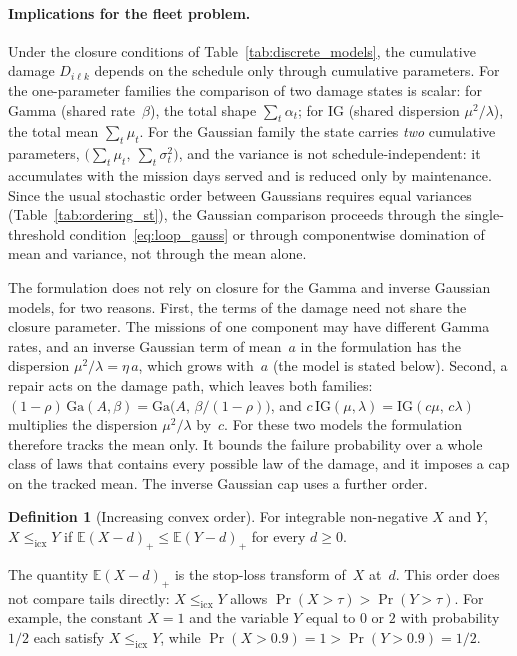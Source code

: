 \documentclass[11pt,a4paper]{article}
\theoremstyle{plain}
\theoremstyle{definition}
\newtheorem{definition}[theorem]{Definition}
\theoremstyle{remark}
\begin{document}
\paragraph{Implications for the fleet problem.}
Under the closure conditions of Table~\ref{tab:discrete_models}, the cumulative damage $D_{i\ell k}$ depends on the schedule only through cumulative parameters.
For the one-parameter families the comparison of two damage states is scalar:
for Gamma (shared rate~$\beta$), the total shape $\sum_t \alpha_t$;
for IG (shared dispersion $\mu^2/\lambda$), the total mean $\sum_t \mu_t$.
For the Gaussian family the state carries \emph{two} cumulative parameters, $\bigl(\sum_t \mu_t,\ \sum_t \sigma_t^2\bigr)$, and the variance is not schedule-independent: it accumulates with the mission days served and is reduced only by maintenance.
Since the usual stochastic order between Gaussians requires equal variances (Table~\ref{tab:ordering_st}), the Gaussian comparison proceeds through the single-threshold condition~\eqref{eq:loop_gauss} or through componentwise domination of mean and variance, not through the mean alone.

The formulation does not rely on closure for the Gamma and inverse Gaussian models, for two reasons.
First, the terms of the damage need not share the closure parameter.
The missions of one component may have different Gamma rates, and an inverse Gaussian term of mean~$a$ in the formulation has the dispersion $\mu^2/\lambda = \eta\, a$, which grows with~$a$ (the model is stated below).
Second, a repair acts on the damage path, which leaves both families: $(1-\rho)\,\mathrm{Ga}(A,\beta) = \mathrm{Ga}\bigl(A,\,\beta/(1-\rho)\bigr)$, and $c\,\mathrm{IG}(\mu,\lambda) = \mathrm{IG}(c\mu,\,c\lambda)$ multiplies the dispersion $\mu^2/\lambda$ by~$c$.
For these two models the formulation therefore tracks the mean only.
It bounds the failure probability over a whole class of laws that contains every possible law of the damage, and it imposes a cap on the tracked mean.
The inverse Gaussian cap uses a further order.

\begin{definition}[Increasing convex order]\label{def:icx}
For integrable non-negative $X$ and $Y$, $X \le_{\mathrm{icx}} Y$ if $\mathbb{E}(X-d)_+ \le \mathbb{E}(Y-d)_+$ for every $d \ge 0$.
\end{definition}

The quantity $\mathbb{E}(X-d)_+$ is the stop-loss transform of~$X$ at~$d$.
This order does not compare tails directly: $X \le_{\mathrm{icx}} Y$ allows $\Pr(X > \tau) > \Pr(Y > \tau)$.
For example, the constant $X = 1$ and the variable $Y$ equal to $0$ or $2$ with probability $1/2$ each satisfy $X \le_{\mathrm{icx}} Y$, while $\Pr(X > 0.9) = 1 > \Pr(Y > 0.9) = 1/2$.
\end{document}
